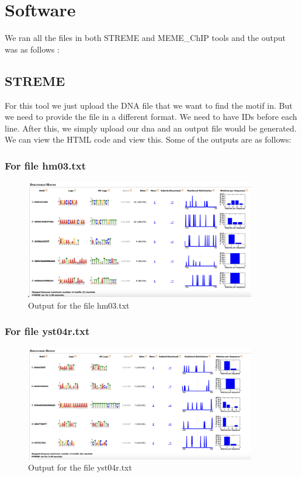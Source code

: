 \documentclass{report}
\begin{document}
\chapter{Software}
We ran all the files in both STREME and MEME_ChIP tools and the output was as follows : 
\section{STREME}
For this tool we just upload the DNA file that we want to find the motif in. But we need to provide the file in a different format. We need to have IDs before each line. After this, we simply upload our dna and an output file would be generated. We can view the HTML code and view this. Some of the outputs are as follows:
\FloatBarrier
\subsection{For file hm03.txt}
\begin{figure}[ht]
    \centering
    \includegraphics[width=0.9\textwidth]{STREME/STREME hm03.png} 
    \caption{Output for the file hm03.txt}
    \label{fig:ui2.4}
\end{figure}
\clearpage

\FloatBarrier
\subsection{For file yst04r.txt}
\begin{figure}[ht]
    \centering
    \includegraphics[width=0.9\textwidth]{STREME/STREME yst04r.png} 
    \caption{Output for the file yst04r.txt}
    \label{fig:ui2.4}
\end{figure}
\end{document}
